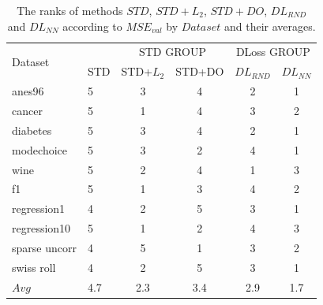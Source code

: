 \documentclass{article}
\newcommand{\kibitz}[2]{\ifnum\Comments=1\textcolor{#1}{#2}\fi}
\newcommand{\kizito}[1]{\kibitz{red} {[Kizito: #1]}}
\newcommand{\enrico}[1]{\kibitz{blue} {[Enrico: #1]}}
\begin{document}
\begin{table}[tb]
  
  \caption{The results of significance tests for differences of $MSE_{val}$ between $STD$ and \emph{DLoss} results. 
  We run the tests on the difference of the standard learning method group - $STD$ group - and the group with \emph{DLoss} - $DL$ group.
  For both $STD$ and $DL$ training we have 2 group, therefore we run all combinations, giving us 6 results, for real data and synthetic.
  We compare each of the 5-fold in the cross validation for each of the 5 datasets, thus 25 samples per test.
  $Median_{\Delta}$ is the median of pairwise difference between the $MSE_{val}$ values of the groups.
  We applied the Wilcoxon Signed Ranked Test, a non-parametric test for significance of differences between the medians. 
  The low $p$-values of the signed rank test indicate that the $STD$ groups' $MSE_{val}$ is significantly greater than the and $DL$ groups' (indicated with an asterisk *). 
  The $^{*},^{**},^{***}$ indicate the significance at 5\%, 1\% and 0.1\% %
  confidence, respectively.
  We also applied a paired t-test. 
  However, the t-test is only strictly valid for normally distributed data, and the Shapiro-Wilk test indicates that the distribution is significantly different from a normal distributions.  
  }
  \label{tabtests}
\end{table}

\begin{table}[tb]
  \begin{center}
  \begin{small}
  \begin{sc}
  \begin{tabular}{llcccc}
  
  \toprule
\multirow{2}{*}{Dataset} & & \multicolumn{2}{c}{STD GROUP}&  \multicolumn{2}{c}{DLoss GROUP}\\
& STD & STD+$L_2$& STD+DO& $DL_{RND}$& $DL_{NN}$\\
  
  \midrule
  anes96  & 5 & 3& 4& 2& 1\\
  cancer & 5 & 1& 4& 3& 2\\
  diabetes  & 5 & 3& 4& 2& 1\\
  modechoice & 5 & 3& 2& 4& 1\\
  wine  & 5& 2& 4& 1& 3\\
  f1 & 5& 1& 3& 4& 2\\
  regression1 & 4& 2& 5& 3& 1 \\
  regression10& 5& 1& 2& 4& 3 \\
  sparse uncorr & 4& 5& 1& 3& 2 \\
  swiss roll & 4& 2& 5& 3& 1 \\
  \hline
  $Avg$& 4.7 & 2.3& 3.4& 2.9& 1.7 \\ 
  \bottomrule
  
  \end{tabular}
  \end{sc}
  \end{small}
  \end{center}
  \caption{The ranks of methods $STD$, $STD+L_2$, $STD+DO$, $DL_{RND}$ and $DL_{NN}$ according to $MSE_{val}$ by $Dataset$ and their averages.}
  \label{tabrank}  
\end{table}
\end{document}
